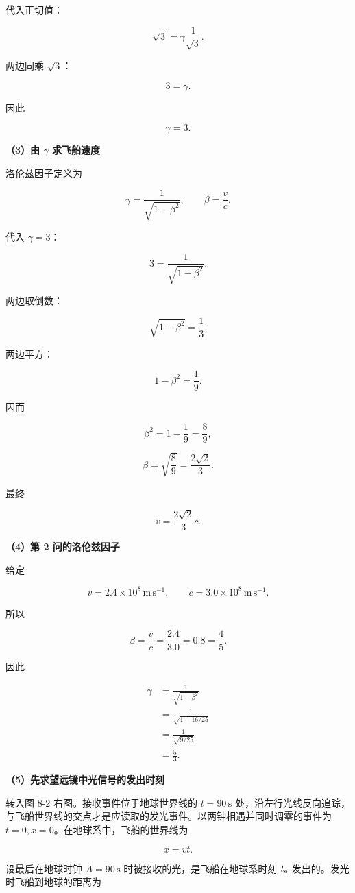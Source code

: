 \documentclass[12pt,a4paper,UTF8]{ctexart}
\begin{document}
代入正切值：

\[
\sqrt3=\gamma\frac1{\sqrt3}.
\]

两边同乘 \(\sqrt3\)：

\[
3=\gamma.
\]

因此

\[
\boxed{\gamma=3}.
\]

\textbf{（3）由 \(\gamma\) 求飞船速度}

洛伦兹因子定义为

\[
\gamma=\frac1{\sqrt{1-\beta^2}},
\qquad
\beta=\frac vc.
\]

代入 \(\gamma=3\)：

\[
3=\frac1{\sqrt{1-\beta^2}}.
\]

两边取倒数：

\[
\sqrt{1-\beta^2}=\frac13.
\]

两边平方：

\[
1-\beta^2=\frac19.
\]

因而

\[
\beta^2=1-\frac19=\frac89,
\]

\[
\beta=\sqrt{\frac89}=\frac{2\sqrt2}{3}.
\]

最终

\[
\boxed{v=\frac{2\sqrt2}{3}c}.
\]

\textbf{（4）第 2 问的洛伦兹因子}

给定

\[
v=2.4\times10^8\,\mathrm{m\,s^{-1}},
\qquad
c=3.0\times10^8\,\mathrm{m\,s^{-1}}.
\]

所以

\[
\beta=\frac vc=\frac{2.4}{3.0}=0.8=\frac45.
\]

因此

\[
\begin{aligned}
\gamma
&=\frac1{\sqrt{1-\beta^2}}\\
&=\frac1{\sqrt{1-16/25}}\\
&=\frac1{\sqrt{9/25}}\\
&=\frac53.
\end{aligned}
\]

\textbf{（5）先求望远镜中光信号的发出时刻}

转入图 8-2 右图。接收事件位于地球世界线的 \(t=90\,\mathrm s\)
处，沿左行光线反向追踪，与飞船世界线的交点才是应读取的发光事件。以两钟相遇并同时调零的事件为
\(t=0,x=0\)。在地球系中，飞船的世界线为

\[
x=vt.
\]

设最后在地球时钟 \(A=90\,\mathrm s\) 时被接收的光，是飞船在地球系时刻
\(t_{\rm e}\) 发出的。发光时飞船到地球的距离为
\end{document}
